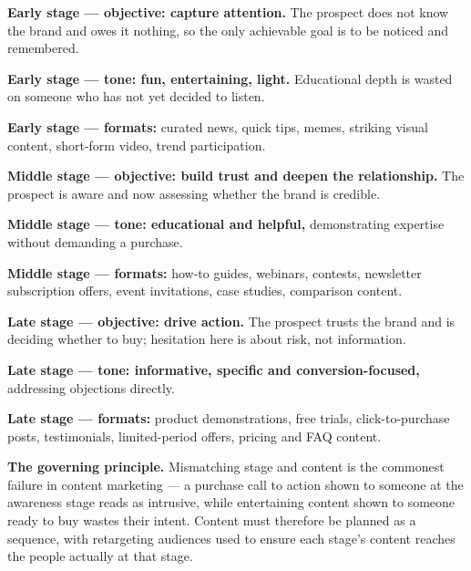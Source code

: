 \begin{qlist}
\begin{apts}
\item \textbf{Early stage --- objective: capture attention.} The prospect does
      not know the brand and owes it nothing, so the only achievable goal is to
      be noticed and remembered.
\item \textbf{Early stage --- tone: fun, entertaining, light.} Educational depth
      is wasted on someone who has not yet decided to listen.
\item \textbf{Early stage --- formats:} curated news, quick tips, memes,
      striking visual content, short-form video, trend participation.
\item \textbf{Middle stage --- objective: build trust and deepen the
      relationship.} The prospect is aware and now assessing whether the brand
      is credible.
\item \textbf{Middle stage --- tone: educational and helpful,} demonstrating
      expertise without demanding a purchase.
\item \textbf{Middle stage --- formats:} how-to guides, webinars, contests,
      newsletter subscription offers, event invitations, case studies,
      comparison content.
\item \textbf{Late stage --- objective: drive action.} The prospect trusts the
      brand and is deciding whether to buy; hesitation here is about risk, not
      information.
\item \textbf{Late stage --- tone: informative, specific and
      conversion-focused,} addressing objections directly.
\item \textbf{Late stage --- formats:} product demonstrations, free trials,
      click-to-purchase posts, testimonials, limited-period offers, pricing and
      FAQ content.
\item \textbf{The governing principle.} Mismatching stage and content is the
      commonest failure in content marketing --- a purchase call to action shown
      to someone at the awareness stage reads as intrusive, while entertaining
      content shown to someone ready to buy wastes their intent. Content must
      therefore be planned as a sequence, with retargeting audiences used to
      ensure each stage's content reaches the people actually at that stage.
\end{apts}


\end{qlist}
